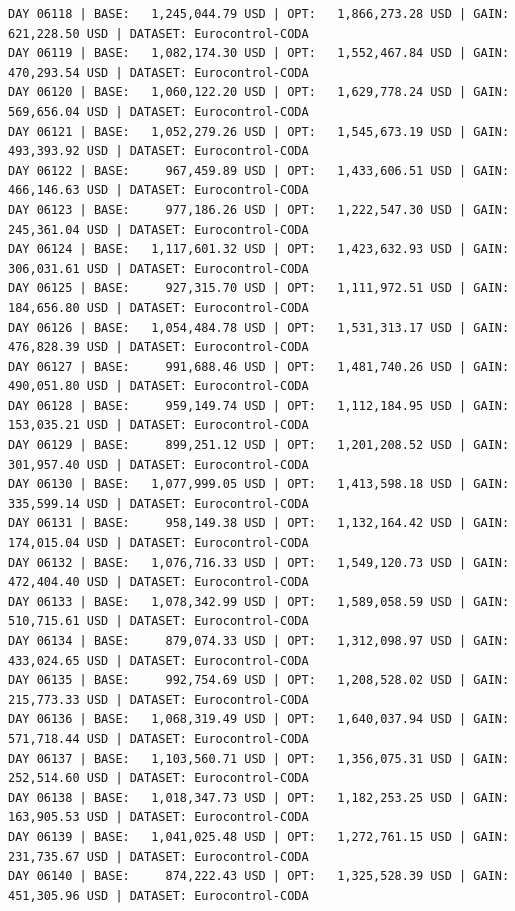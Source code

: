 \documentclass[11pt,a4paper]{article}
\begin{document}
\begin{verbatim}
DAY 06118 | BASE:   1,245,044.79 USD | OPT:   1,866,273.28 USD | GAIN: 621,228.50 USD | DATASET: Eurocontrol-CODA
DAY 06119 | BASE:   1,082,174.30 USD | OPT:   1,552,467.84 USD | GAIN: 470,293.54 USD | DATASET: Eurocontrol-CODA
DAY 06120 | BASE:   1,060,122.20 USD | OPT:   1,629,778.24 USD | GAIN: 569,656.04 USD | DATASET: Eurocontrol-CODA
DAY 06121 | BASE:   1,052,279.26 USD | OPT:   1,545,673.19 USD | GAIN: 493,393.92 USD | DATASET: Eurocontrol-CODA
DAY 06122 | BASE:     967,459.89 USD | OPT:   1,433,606.51 USD | GAIN: 466,146.63 USD | DATASET: Eurocontrol-CODA
DAY 06123 | BASE:     977,186.26 USD | OPT:   1,222,547.30 USD | GAIN: 245,361.04 USD | DATASET: Eurocontrol-CODA
DAY 06124 | BASE:   1,117,601.32 USD | OPT:   1,423,632.93 USD | GAIN: 306,031.61 USD | DATASET: Eurocontrol-CODA
DAY 06125 | BASE:     927,315.70 USD | OPT:   1,111,972.51 USD | GAIN: 184,656.80 USD | DATASET: Eurocontrol-CODA
DAY 06126 | BASE:   1,054,484.78 USD | OPT:   1,531,313.17 USD | GAIN: 476,828.39 USD | DATASET: Eurocontrol-CODA
DAY 06127 | BASE:     991,688.46 USD | OPT:   1,481,740.26 USD | GAIN: 490,051.80 USD | DATASET: Eurocontrol-CODA
DAY 06128 | BASE:     959,149.74 USD | OPT:   1,112,184.95 USD | GAIN: 153,035.21 USD | DATASET: Eurocontrol-CODA
DAY 06129 | BASE:     899,251.12 USD | OPT:   1,201,208.52 USD | GAIN: 301,957.40 USD | DATASET: Eurocontrol-CODA
DAY 06130 | BASE:   1,077,999.05 USD | OPT:   1,413,598.18 USD | GAIN: 335,599.14 USD | DATASET: Eurocontrol-CODA
DAY 06131 | BASE:     958,149.38 USD | OPT:   1,132,164.42 USD | GAIN: 174,015.04 USD | DATASET: Eurocontrol-CODA
DAY 06132 | BASE:   1,076,716.33 USD | OPT:   1,549,120.73 USD | GAIN: 472,404.40 USD | DATASET: Eurocontrol-CODA
DAY 06133 | BASE:   1,078,342.99 USD | OPT:   1,589,058.59 USD | GAIN: 510,715.61 USD | DATASET: Eurocontrol-CODA
DAY 06134 | BASE:     879,074.33 USD | OPT:   1,312,098.97 USD | GAIN: 433,024.65 USD | DATASET: Eurocontrol-CODA
DAY 06135 | BASE:     992,754.69 USD | OPT:   1,208,528.02 USD | GAIN: 215,773.33 USD | DATASET: Eurocontrol-CODA
DAY 06136 | BASE:   1,068,319.49 USD | OPT:   1,640,037.94 USD | GAIN: 571,718.44 USD | DATASET: Eurocontrol-CODA
DAY 06137 | BASE:   1,103,560.71 USD | OPT:   1,356,075.31 USD | GAIN: 252,514.60 USD | DATASET: Eurocontrol-CODA
DAY 06138 | BASE:   1,018,347.73 USD | OPT:   1,182,253.25 USD | GAIN: 163,905.53 USD | DATASET: Eurocontrol-CODA
DAY 06139 | BASE:   1,041,025.48 USD | OPT:   1,272,761.15 USD | GAIN: 231,735.67 USD | DATASET: Eurocontrol-CODA
DAY 06140 | BASE:     874,222.43 USD | OPT:   1,325,528.39 USD | GAIN: 451,305.96 USD | DATASET: Eurocontrol-CODA

\end{verbatim}
\end{document}
